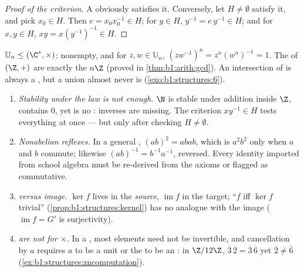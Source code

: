 \begin{proof}[Proof of the criterion]
A  obviously satisfies it. Conversely, let $H \neq \emptyset$
satisfy it, and pick $x_0 \in H$. Then $e = x_0 x_0^{-1} \in H$; for
$y \in H$, $y^{-1} = e\,y^{-1} \in H$; and for $x, y \in H$, $xy =
x (y^{-1})^{-1} \in H$.
\end{proof}

\begin{example}\label{ex:b1:structures:subgroups}
$\mathbb{U}_n \leq (\C^*, \times)$: nonempty, and for $z, w \in
\mathbb{U}_n$, $(zw^{-1})^n = z^n (w^n)^{-1} = 1$. The  of
$(\Z, +)$ are exactly the $n\Z$ (proved in
\cref{thm:b1:arith:gcd}). An intersection of  is always a
, but a union almost never is
(\cref{exo:b1:structures:6}).
\end{example}

\begin{remark}\label{rem:b1:structures:pitfalls}
\begin{enumerate}
  \item \emph{Stability under the law is not enough.} $\N$ is
        stable under addition inside $\Z$, contains $0$, yet is
        no : inverses are missing. The criterion
        $xy^{-1} \in H$ tests everything at once --- but only
        after checking $H \neq \emptyset$.
  \item \emph{Nonabelian reflexes.} In a general , $(ab)^2 =
        abab$, which is $a^2b^2$ only when $a$ and $b$ commute;
        likewise $(ab)^{-1} = b^{-1}a^{-1}$,  reversed.
        Every identity imported from school algebra must be
        re-derived from the axioms or flagged as commutative.
  \item \emph{ versus image.} $\ker f$ lives in the
        \emph{source}, $\operatorname{im} f$ in the target;
        ``$f$  iff $\ker f$ trivial''
        (\cref{prop:b1:structures:kernel}) has no analogue with
        the image ($\operatorname{im} f = G'$ is surjectivity).
  \item \emph{ are not  for $\times$.} In a , most
        elements need not be invertible, and cancellation by $a$
        requires $a$ to be a unit or the  to be an : in $\Z/12\Z$, $\overline3\,\overline2 =
        \overline3\,\overline6$ yet $\overline2 \neq \overline6$
        (\cref{ex:b1:structures:zncomputation}).
\end{enumerate}
\end{remark}

